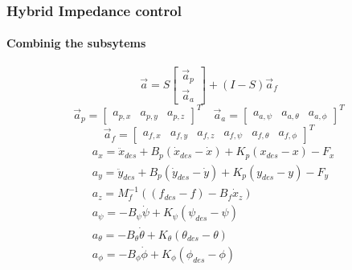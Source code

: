 \begin{frame}
  \frametitle{Hybrid Impedance control}
  \framesubtitle{Combinig the subsytems}
  \begin{equation*}
    \vec{a} = S 
    \begin{bmatrix}
      \vec{a}_p \\
      \vec{a}_a
    \end{bmatrix} + (I - S) \vec{a}_f
  \end{equation*}
  \begin{equation*}
    \vec{a}_p = 
    \begin{bmatrix}
      a_{p,x} & a_{p,y} & a_{p,z}
    \end{bmatrix}^T
    \quad
    \vec{a}_a = 
    \begin{bmatrix}
      a_{a, \psi} & a_{a, \theta} & a_{a, \phi}
    \end{bmatrix}^T
  \end{equation*}
  \begin{equation*}
    \vec{a}_f = 
    \begin{bmatrix}
      a_{f,x} & a_{f,y} & a_{f,z} & a_{f, \psi} & a_{f, \theta} & a_{f, \phi}
    \end{bmatrix}^T
  \end{equation*}
  \begin{align*}
    & a_x = \ddot{x}_{des} + B_p (\dot{x}_{des} - \dot{x}) + K_p (x_{des} - x) - F_x \\
    & a_y = \ddot{y}_{des} + B_p (\dot{y}_{des} - \dot{y}) + K_p (y_{des} - y) - F_y \\
    & a_z= M_f^{-1}((f_{des} - f) - B_f \dot{x}_z) \\
    & a_{\psi} = - B_{\psi} \dot{\psi} + K_{\psi} (\psi_{des} - \psi) \\
    & a_{\theta} = - B_{\theta} \dot{\theta} + K_{\theta} (\theta_{des} - \theta) \\
    & a_{\phi} = - B_{\phi} \dot{\phi} + K_{\phi} (\phi_{des} - \phi)
  \end{align*}
\end{frame}
